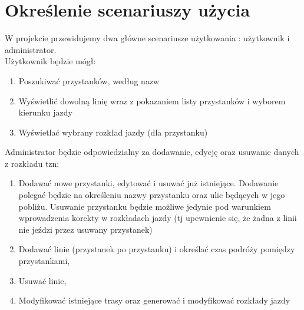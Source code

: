 \section{Określenie scenariuszy użycia}
W projekcie przewidujemy dwa główne scenariusze użytkowania : użytkownik i administrator.\\
Użytkownik będzie mógł:
\begin{enumerate}
\item Poszukiwać przystanków, według nazw
\item Wyświetlić dowolną linię wraz z pokazaniem listy przystanków i wyborem kierunku jazdy
\item Wyświetlać wybrany rozkład jazdy (dla przystanku)
\end{enumerate}

Administrator będzie odpowiedzialny za dodawanie, edycję oraz usuwanie danych z rozkładu tzn:
\begin{enumerate}
\item Dodawać nowe przystanki, edytować i usuwać już istniejące. Dodawanie polegać będzie na określeniu nazwy przystanku oraz ulic będących w jego pobliżu.
Usuwanie przystanku będzie możliwe jedynie pod warunkiem wprowadzenia korekty w rozkładach jazdy (tj upewnienie się, że żadna z linii nie
jeździ przez usuwany przystanek)
\item Dodawać linie  (przystanek po przystanku) i określać czas podróży pomiędzy przystankami,
\item Usuwać linie,
\item Modyfikować istniejące trasy oraz generować i modyfikować rozkłady jazdy
\end{enumerate}


